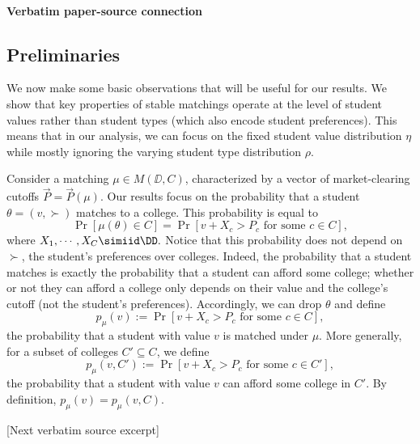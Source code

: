 \documentclass[10pt]{article}
\begin{document}
\paragraph{Verbatim paper-source connection}
\begin{ReviewVerbatim}
\subsection{Preliminaries}
We now make some basic observations that will be useful for our results. We show that key properties of stable matchings operate at the level of student values rather than student types (which also encode student preferences). This means that in our analysis, we can focus on the fixed student value distribution $\eta$ while mostly ignoring the varying student type distribution $\rho$.

Consider a matching $\mu\in M(\DD, C)$, characterized by a vector of market-clearing cutoffs $\vec{P}=\vec{P}(\mu)$. Our results focus on the probability that a student $\theta=(v,\succ)$ matches to a college. This probability is equal to
\begin{equation}
    \Pr[\mu(\theta)\in C] = \Pr[v + X_c > P_c\text{ for some $c\in C$}],
\end{equation}
where $X_1, \cdots, X_C \simiid \DD.$ Notice that this probability does not depend on $\succ$, the student's preferences over colleges. Indeed, the probability that a student matches is exactly the probability that a student can afford some college; whether or not they can afford a college only depends on their value and the college's cutoff (not the student's preferences). Accordingly, we can drop $\theta$ and define
\begin{equation}
    p_\mu(v) := \Pr[v + X_c > P_c\text{ for some $c\in C$}],
\end{equation}
the probability that a student with value $v$ is matched under $\mu$. More generally, for a subset of colleges $C'\subseteq C$, we define
\begin{equation}
    p_\mu(v, C') := \Pr[v + X_c > P_c\text{ for some $c\in C'$}],
\end{equation}
the probability that a student with value $v$ can afford some college in $C'$. By definition, $p_\mu(v) = p_\mu(v, C).$

[Next verbatim source excerpt]


\end{ReviewVerbatim}
\end{document}

